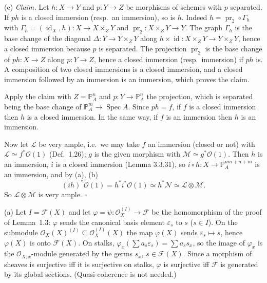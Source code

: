 \documentclass[11pt]{article}
\begin{document}
(c) \emph{Claim.} Let $h:X\to Y$ and $p:Y\to Z$ be morphisms of schemes with $p$ separated. If $ph$ is a closed immersion (resp.\ an immersion), so is $h$. Indeed $h=\operatorname{pr}_2\circ\Gamma_h$ with $\Gamma_h=(\operatorname{id}_X,h):X\to X\times_ZY$ and $\operatorname{pr}_2:X\times_ZY\to Y$. The graph $\Gamma_h$ is the base change of the diagonal $\Delta:Y\to Y\times_ZY$ along $h\times\operatorname{id}:X\times_ZY\to Y\times_ZY$, hence a closed immersion because $p$ is separated. The projection $\operatorname{pr}_2$ is the base change of $ph:X\to Z$ along $p:Y\to Z$, hence a closed immersion (resp.\ immersion) if $ph$ is. A composition of two closed immersions is a closed immersion, and a closed immersion followed by an immersion is an immersion, which proves the claim.

Apply the claim with $Z=\mathbb{P}^n_A$ and $p:Y\to\mathbb{P}^n_A$ the projection, which is separated being the base change of $\mathbb{P}^m_A\to\operatorname{Spec}A$. Since $ph=f$, if $f$ is a closed immersion then $h$ is a closed immersion. In the same way, if $f$ is an immersion then $h$ is an immersion.

Now let $\mathcal{L}$ be very ample, i.e.\ we may take $f$ an immersion (closed or not) with $\mathcal{L}\simeq f^*\mathcal{O}(1)$ (Def.~1.26); $g$ is the given morphism with $\mathcal{M}\simeq g^*\mathcal{O}(1)$. Then $h$ is an immersion, $i$ is a closed immersion (Lemma 3.3.31), so $i\circ h:X\to\mathbb{P}^{nm+n+m}_A$ is an immersion, and by (a), (b)
\[ (ih)^*\mathcal{O}(1)=h^*i^*\mathcal{O}(1)\simeq h^*\mathcal{N}\simeq\mathcal{L}\otimes\mathcal{M}. \]
So $\mathcal{L}\otimes\mathcal{M}$ is very ample. \hfill$\square$

\pf
(a) Let $I=\mathcal{F}(X)$ and let $\varphi=\psi:\mathcal{O}_X^{(I)}\to\mathcal{F}$ be the homomorphism of the proof of Lemma~1.3: $\varphi$ sends the canonical basis element $\varepsilon_s$ to $s$ ($s\in I$). On the submodule $\mathcal{O}_X(X)^{(I)}\subseteq\mathcal{O}_X^{(I)}(X)$ the map $\varphi(X)$ sends $\varepsilon_s\mapsto s$, hence $\varphi(X)$ is onto $\mathcal{F}(X)$. On stalks, $\varphi_x(\sum a_s\varepsilon_s)=\sum a_ss_x$, so the image of $\varphi_x$ is the $\mathcal{O}_{X,x}$-module generated by the germs $s_x$, $s\in\mathcal{F}(X)$. Since a morphism of sheaves is surjective iff it is surjective on stalks, $\varphi$ is surjective iff $\mathcal{F}$ is generated by its global sections. (Quasi-coherence is not needed.)
\end{document}
